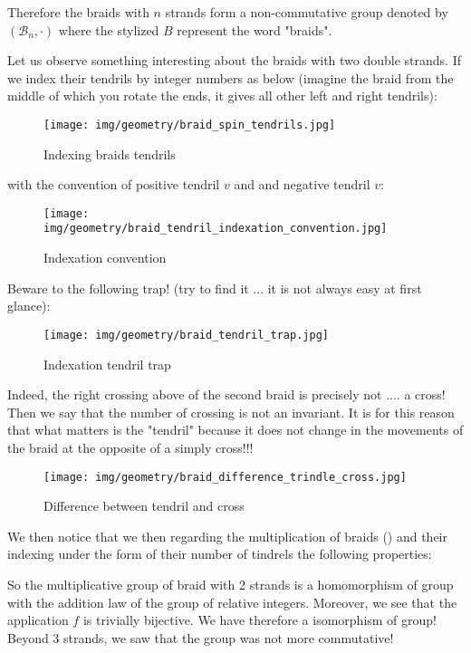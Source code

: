 {	 Therefore the braids with $n$ strands form a non-commutative group denoted by $(\mathcal{B}_n,\cdot)$ where the stylized $B$ represent the word "braids".
	 
	 Let us observe something interesting about the braids with two double strands. If we index their tendrils by integer numbers as below (imagine the braid from the middle of which you rotate the ends, it gives all other left and right tendrils):
	 \begin{figure}[H]
		\centering
		\texttt{[image: img/geometry/braid\_spin\_tendrils.jpg]}
		\caption{Indexing braids tendrils}
	\end{figure}
	with the convention of positive tendril $v$ and and negative tendril $v$:
	\begin{figure}[H]
		\centering
		\texttt{[image: img/geometry/braid\_tendril\_indexation\_convention.jpg]}
		\caption{Indexation convention}
	\end{figure}
	Beware to the following trap! (try to find it ... it is not always easy at first glance):
	\begin{figure}[H]
		\centering
		\texttt{[image: img/geometry/braid\_tendril\_trap.jpg]}
		\caption{Indexation tendril trap}
	\end{figure}
	Indeed, the right crossing above of the second braid is precisely not .... a cross! Then we say that the number of crossing is not an invariant. It is for this reason that what matters is the "tendril" because it does not change in the movements of the braid at the opposite of a simply cross!!!
	\begin{figure}[H]
		\centering
		\texttt{[image: img/geometry/braid\_difference\_trindle\_cross.jpg]}
		\caption{Difference between tendril and cross}
	\end{figure}
	We then notice that we then regarding the multiplication of braids () and their indexing under the form of their number of tindrels the following properties:
	
	So the multiplicative group of braid with 2 strands is a homomorphism of group with the addition law of the group of relative integers. Moreover, we see that the application $f$ is trivially bijective. We have therefore a isomorphism of group! Beyond 3 strands, we saw that the group was not more commutative!
	
}
